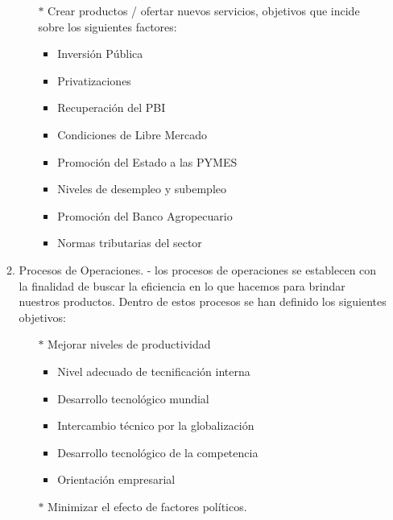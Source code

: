 \begin{enumerate}[a)]
\begin{enumerate}[1.]
\begin{itemize}
\begin{itemize}
				\end{itemize}


				\item[$*$] Crear productos / ofertar nuevos servicios, objetivos que incide sobre los siguientes factores:

				\begin{itemize}

  				  \item Inversión Pública
				\item Privatizaciones
				\item Recuperación del PBI
				\item Condiciones de Libre Mercado
				\item Promoción del Estado a las PYMES
				\item Niveles de desempleo y subempleo
				\item Promoción del Banco Agropecuario
				\item Normas tributarias del sector 


				\end{itemize}

			\end{itemize}

   		\item Procesos de Operaciones. - los procesos de operaciones se establecen con la finalidad de
buscar la eficiencia en lo que hacemos para brindar nuestros productos. Dentro de estos
procesos se han definido los siguientes objetivos:


			\begin{itemize}

				\item[$*$] Mejorar niveles de productividad

				\begin{itemize}

  				  \item Nivel adecuado de tecnificación interna
				\item Desarrollo tecnológico mundial
				\item Intercambio técnico por la globalización
				\item Desarrollo tecnológico de la competencia
				\item Orientación empresarial


				\end{itemize}


				\item[$*$] Minimizar el efecto de factores políticos.


\end{itemize}
\end{enumerate}
\end{enumerate}
